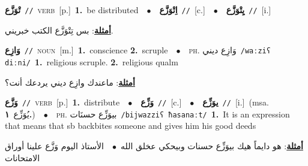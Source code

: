 \documentclass[10pt,a4paper,twoside]{article} %
\begin{document}
\begin{multicols}{2}
{\setlength\topsep{0pt}\textbf{\foreignlanguage{arabic}{تْوَزَّع}}\ {\color{gray}\texttt{//}\color{black}}\ \textsc{verb}\ [p.]\ \textbf{1.}~be distributed\ \ $\bullet$\ \ \setlength\topsep{0pt}\textbf{\foreignlanguage{arabic}{اِتْوَزَّع}}\ {\color{gray}\texttt{//}\color{black}}\ [c.]\ \ $\bullet$\ \ \setlength\topsep{0pt}\textbf{\foreignlanguage{arabic}{يِتْوَزَّع}}\ {\color{gray}\texttt{//}\color{black}}\ [i.]\  \begin{flushright}\color{gray}\foreignlanguage{arabic}{\textbf{\underline{\foreignlanguage{arabic}{أمثلة}}}: بس تِتْوَزَّع الكتب خبريني.}\end{flushright}\color{black}} \vspace{2mm}

{\setlength\topsep{0pt}\textbf{\foreignlanguage{arabic}{وَازِع}}\ {\color{gray}\texttt{//}\color{black}}\ \textsc{noun}\ [m.]\ \textbf{1.}~conscience  \textbf{2.}~scruple\ \ $\bullet$\ \ \textsc{ph.} \color{gray} \foreignlanguage{arabic}{وَازِع ديني}\color{black}\ {\color{gray}\texttt{/{\sffamily waːziʕ diːni}/}\color{black}}\ \textbf{1.}~religious scruple.  \textbf{2.}~religious qualm\  \begin{flushright}\color{gray}\foreignlanguage{arabic}{\textbf{\underline{\foreignlanguage{arabic}{أمثلة}}}: ماعندك وازِع ديني يردعك أنت؟}\end{flushright}\color{black}} \vspace{2mm}

{\setlength\topsep{0pt}\textbf{\foreignlanguage{arabic}{وَزَّع}}\ {\color{gray}\texttt{//}\color{black}}\ \textsc{verb}\ [p.]\ \textbf{1.}~distribute\ \ $\bullet$\ \ \setlength\topsep{0pt}\textbf{\foreignlanguage{arabic}{وَزِّع}}\ {\color{gray}\texttt{//}\color{black}}\ [c.]\ \ $\bullet$\ \ \setlength\topsep{0pt}\textbf{\foreignlanguage{arabic}{يوَزِّع}}\ {\color{gray}\texttt{//}\color{black}}\ [i.]\ \color{gray}(msa. \foreignlanguage{arabic}{يُوَزِّع}~\foreignlanguage{arabic}{\textbf{١.}})\color{black}\ \ $\bullet$\ \ \textsc{ph.} \color{gray} \foreignlanguage{arabic}{بيوَزِّع حسنَات}\color{black}\ {\color{gray}\texttt{/{\sffamily bijwazziʕ ħasanaːt}/}\color{black}}\ \textbf{1.}~It is an expression that means that sb backbites someone and gives him his good deeds\  \begin{flushright}\color{gray}\foreignlanguage{arabic}{\textbf{\underline{\foreignlanguage{arabic}{أمثلة}}}: هو دايماً هيك بيوَزِّع حسنات وبيحكي عخلق الله\ $\bullet$\ \  الأستاذ اليوم وَزَّع علينا أوراق الامتحانات}\end{flushright}\color{black}} \vspace{2mm}


\end{multicols}
\end{document}
